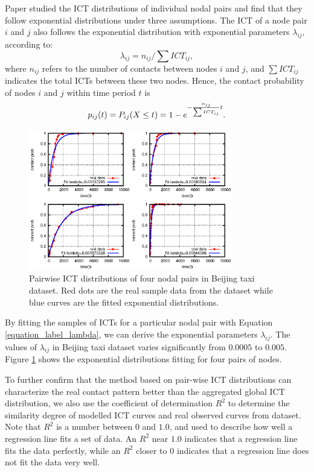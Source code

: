 \documentclass[conference]{IEEEtran}
\begin{document}
 Paper \cite{vHuWang-23} studied the ICT distributions of individual nodal pairs and find that they follow exponential distributions under three assumptions. The ICT of a node pair $i$ and $j$ also follows the exponential distribution with exponential parameters $\lambda_{ij}$, according to:
 \begin{equation}\label{equation_label_lambda}
        \lambda_{ij} = n_{ij}/\sum ICT_{ij},
 \end{equation}
where $n_{ij}$ refers to the number of contacts between nodes $i$ and $j$, and $\sum ICT_{ij}$ indicates the total ICTs between these two nodes. Hence, the contact probability of nodes $i$ and $j$ within time period $t$ is
\begin{equation}\label{equation_label_probability}
    p_{ij}(t)=P_{ij}(X\leq t)= 1-e^{-{n_{ij}\over {\sum ICT_{ij}}}t}.
 \end{equation}

\begin{figure}[!h]
\centering
  \includegraphics[width=3.5in]{figures_1/multiplot-nodepair.eps}
  \caption{Pairwise ICT distributions of four nodal pairs in Beijing taxi dataset. Red dots are the real sample data from the dataset while blue curves are the fitted exponential distributions.}\label{figure_label_ICT_Distribution}
\end{figure}

By fitting the samples of ICTs for a particular nodal pair with Equation \ref{equation_label_lambda}, we can derive the exponential parameters $\lambda_{ij}$. The values of $\lambda_{ij}$ in Beijing taxi dataset varies significantly from $0.0005$ to $0.005$. Figure \ref{figure_label_ICT_Distribution} shows the exponential distributions fitting for four pairs of nodes.

To further confirm that the method based on pair-wise ICT distributions can characterize the real contact pattern better than the aggregated global ICT distribution, we also use the coefficient of determination $R^{2}$ \cite{ozer1985correlation} to determine the similarity degree of modelled ICT curves and real observed curves from dataset. Note that $R^{2}$ is a number between $0$ and $1.0$, and used to describe how well a regression line fits a set of data. An $R^{2}$ near $1.0$ indicates that a regression line fits the data perfectly, while an $R^{2}$ closer to $0$ indicates that a regression line does not fit the data very well.
\end{document}
